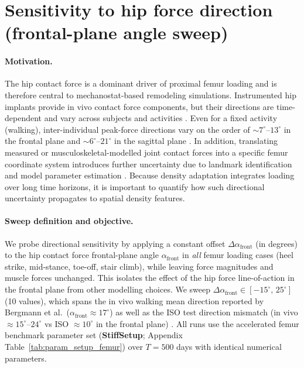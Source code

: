 \section*{Sensitivity to hip force direction (frontal-plane angle sweep)}
\label{sec:alpha-front-sweep}

\paragraph{Motivation.}
The hip contact force is a dominant driver of proximal femur loading and is therefore central to mechanostat-based remodeling simulations.
Instrumented hip implants provide in vivo contact force components, but their directions are time-dependent and vary across subjects and activities \cite{Bergmann2016_StandardizedLoadsHipImplants,OrthoLoadDatabase}.
Even for a fixed activity (walking), inter-individual peak-force directions vary on the order of $\sim 7^\circ$--$13^\circ$ in the frontal plane and $\sim 6^\circ$--$21^\circ$ in the sagittal plane \cite{Bergmann2016_StandardizedLoadsHipImplants}.
In addition, translating measured or musculoskeletal-modelled joint contact forces into a specific femur coordinate system introduces further uncertainty due to landmark identification and model parameter estimation \cite{Valente2014_MSKUncertainty}.
Because density adaptation integrates loading over long time horizons, it is important to quantify how such directional uncertainty propagates to spatial density features.

\paragraph{Sweep definition and objective.}
We probe directional sensitivity by applying a constant offset $\Delta\alpha_{\mathrm{front}}$ (in degrees) to the hip contact force frontal-plane angle $\alpha_{\mathrm{front}}$ in \emph{all} femur loading cases (heel strike, mid-stance, toe-off, stair climb), while leaving force magnitudes and muscle forces unchanged.
This isolates the effect of the hip force line-of-action in the frontal plane from other modelling choices.
We sweep $\Delta\alpha_{\mathrm{front}}\in[-15^\circ,\,25^\circ]$ (10 values), which spans the in vivo walking mean direction reported by Bergmann et al.\ ($\alpha_{\mathrm{front}}\approx 17^\circ$) as well as the ISO test direction mismatch (in vivo $\approx 15^\circ$--$24^\circ$ vs ISO $\approx 10^\circ$ in the frontal plane) \cite{Bergmann2016_StandardizedLoadsHipImplants}.
All runs use the accelerated femur benchmark parameter set (\textbf{StiffSetup}; Appendix Table~\ref{tab:param_setup_femur}) over $T=500$ days with identical numerical parameters.

